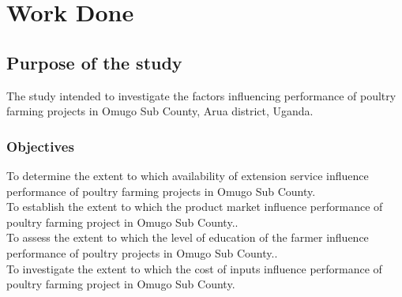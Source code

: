 

\chapter{Work Done}

\section{Purpose of the study}
The study intended to investigate the factors influencing performance of poultry farming projects in Omugo Sub County, Arua district, Uganda.


\subsection{Objectives}
To determine the extent to which availability of extension service influence performance of poultry farming projects in Omugo Sub County.\\
To establish the extent to which the product market influence performance of poultry farming project in Omugo Sub County..\\
To assess the extent to which the level of education of the farmer influence performance of poultry projects in Omugo Sub County..\\
To investigate the extent to which the cost of inputs influence performance of poultry farming project in Omugo Sub County.



